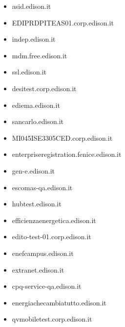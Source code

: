 \documentclass{article}
\begin{document}
\begin{itemize}
            \item asid.edison.it
        
            \item EDIPRDPITEAS01.corp.edison.it
        
            \item indep.edison.it
        
            \item mdm.free.edison.it
        
            \item ssl.edison.it
        
            \item desitest.corp.edison.it
        
            \item ediema.edison.it
        
            \item sancarlo.edison.it
        
            \item MI045ISE3305CED.corp.edison.it
        
            \item enterpriseregistration.fenice.edison.it
        
            \item gen-e.edison.it
        
            \item escomas-qa.edison.it
        
            \item hubtest.edison.it
        
            \item efficienzaenergetica.edison.it
        
            \item edito-test-01.corp.edison.it
        
            \item enefcampus.edison.it
        
            \item extranet.edison.it
        
            \item cpq-service-qa.edison.it
        
            \item energiachecambiatutto.edison.it
        
            \item qvmobiletest.corp.edison.it
        

\end{itemize}
\end{document}
